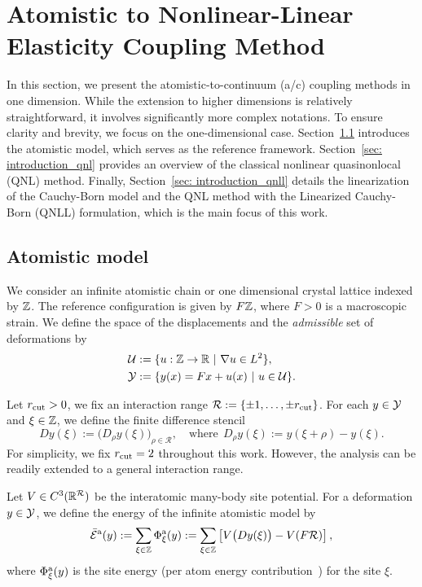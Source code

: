 \section{Atomistic to Nonlinear-Linear Elasticity Coupling Method}
\label{sec: qnll_model}

In this section, we present the atomistic-to-continuum (a/c) coupling methods in one dimension. While the extension to higher dimensions is relatively straightforward, it involves significantly more complex notations. To ensure clarity and brevity, we focus on the one-dimensional case. Section~\ref{sec: introduction_atom} introduces the atomistic model, which serves as the reference framework. Section~\ref{sec: introduction_qnl} provides an overview of the classical nonlinear quasinonlocal (QNL) method. Finally, Section~\ref{sec: introduction_qnll} details the linearization of the Cauchy-Born model and the QNL method with the Linearized Cauchy-Born (QNLL) formulation, which is the main focus of this work.

\subsection{Atomistic model}
\label{sec: introduction_atom}

We consider an infinite atomistic chain or one dimensional crystal lattice indexed by $\mathbb{Z}$. The reference configuration is given by $F\mathbb{Z}$, where $F>0$ is a macroscopic strain. 
We define the space of the displacements and the {\it admissible} set of deformations by
\begin{align*}
	\mathcal{U}&:=\{u:\mathbb{Z}\rightarrow\mathbb{R} ~|~ \nabla u \in L^{2} \},\\
	\mathcal{Y}&:=\{y(x)= Fx+u(x) ~|~ u \in \mathcal{U}\}.
\end{align*}

Let $r_{{\rm cut}}>0$, we fix an interaction range $\mathcal{R} := \{\pm1,\dots,\pm r_{{\rm cut}}\}$. For each $y \in \mathcal{Y}$ and $\xi \in \mathbb{Z}$, we define the finite difference stencil 
\begin{equation*}
	Dy(\xi):= \big(D_{\rho}y(\xi)\big)_{\rho \in \mathcal{R}}, \quad \text{where} ~~ D_{\rho}y(\xi):= y(\xi + \rho )-y(\xi).
\end{equation*}
For simplicity, we fix $r_{{\rm cut}} = 2$ throughout this work. However, the analysis can be readily extended to a general interaction range.

Let $V\in C^{3}(\mathbb{R}^{\mathcal{R}})$ be the interatomic many-body site potential. For a deformation $y\in\mathcal{Y}$, we define the energy of the infinite atomistic model by
\begin{equation}\label{All-Atomistic Energy}
	\bar{\mathcal{E}}^{{\rm a}} (y):= \sum_{\xi\in\mathbb{Z}}\Phi^{{\rm a}}_{\xi}(y) := \sum_{\xi\in\mathbb{Z}} \left[V\big(Dy(\xi)\big)-V(F\mathcal{R})\right],
\end{equation}
where $\Phi^{{\rm a}}_{\xi}(y)$ is the site energy (per atom energy contribution~\cite{2013_ML_CO_AC_Coupling_ACTANUM}) for the site $\xi$.

